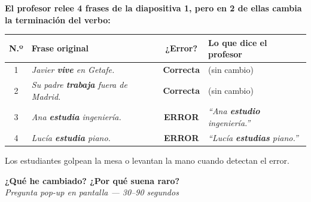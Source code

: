 \documentclass[a4paper,10pt]{article}
\renewcommand{\arraystretch}{1.3}
\begin{document}
\vspace{0.4cm}

\noindent\textcolor{azulprincipal}{\textbf{\large El profesor relee 4 frases de la diapositiva 1, pero en 2 de ellas cambia la terminación del verbo:}}

\vspace{0.4cm}

\renewcommand{\arraystretch}{1.6}
\begin{center}
\begin{tabularx}{0.95\textwidth}{c X c >{\raggedright\arraybackslash}p{4cm}}
\textbf{N.º} & \textbf{Frase original} & \textbf{¿Error?} & \textbf{Lo que dice el profesor} \\
\midrule
1 & \textit{Javier \textbf{vive} en Getafe.} & \textcolor{verde}{\textbf{Correcta}} & (sin cambio) \\[4pt]
2 & \textit{Su padre \textbf{trabaja} fuera de Madrid.} & \textcolor{verde}{\textbf{Correcta}} & (sin cambio) \\[4pt]
3 & \textit{Ana \textbf{estudia} ingeniería.} & \textcolor{rojofinal}{\textbf{ERROR}} & \textit{``Ana \textbf{estudio} ingeniería.''} \\[4pt]
4 & \textit{Lucía \textbf{estudia} piano.} & \textcolor{rojofinal}{\textbf{ERROR}} & \textit{``Lucía \textbf{estudias} piano.''} \\
\end{tabularx}
\end{center}

\vspace{0.4cm}

\begin{notabox}
{\small Los estudiantes golpean la mesa o levantan la mano cuando detectan el error.}
\end{notabox}

\vspace{0.4cm}

\begin{preguntabox}
\centering\large\textbf{¿Qué he cambiado? ¿Por qué suena raro?}\\[0.2cm]
{\normalsize\textit{Pregunta pop-up en pantalla — 30--90 segundos}}
\end{preguntabox}

\newpage

\end{document}
